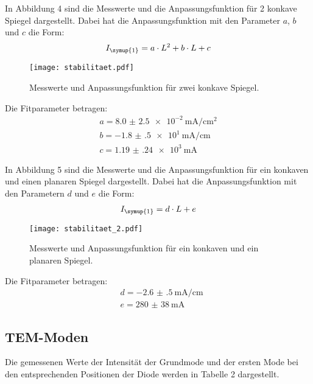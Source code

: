 In Abbildung 4 sind die Messwerte und die Anpassungsfunktion für 2 konkave Spiegel dargestellt.
Dabei hat die Anpassungsfunktion mit den Parameter $a$, $b$ und $c$ die Form:
\begin{align*}
  I_{\symup{1}} = a \cdot L^2 + b \cdot L + c
\end{align*}
\begin{figure}[H]
  \centering
  \texttt{[image: stabilitaet.pdf]}
  \caption{Messwerte und Anpassungsfunktion für zwei konkave Spiegel.}
  \label{fig:plot}
\end{figure}

Die Fitparameter betragen:
\begin{align*}
  a = \SI{ 8.0(25)e-2}{\milli\ampere\per\centi\meter\squared} \\
  b = \SI{-1.8(5)e1}{\milli\ampere\per\centi\meter} \\
  c = \SI{1.19(24)e3}{\milli\ampere}
\end{align*}


In Abbildung 5 sind die Messwerte und die Anpassungsfunktion für ein konkaven und einen
planaren Spiegel dargestellt.
Dabei hat die Anpassungsfunktion mit den Parametern $d$ und $e$ die Form:
\begin{align*}
  I_{\symup{1}} = d \cdot L + e
\end{align*}

\begin{figure}[H]
  \centering
  \texttt{[image: stabilitaet\_2.pdf]}
  \caption{Messwerte und Anpassungsfunktion für ein konkaven und ein planaren Spiegel.}
  \label{fig:plot}
\end{figure}

Die Fitparameter betragen:
\begin{align*}
  &d = \SI{-2.6(5)}{\milli\ampere\per\centi\meter} \\
  &e = \SI{280(38)}{\milli\ampere}
\end{align*}

\subsection{TEM-Moden}
Die gemessenen Werte der Intensität der Grundmode und der ersten Mode bei den
entsprechenden Positionen der Diode werden in Tabelle 2 dargestellt.

